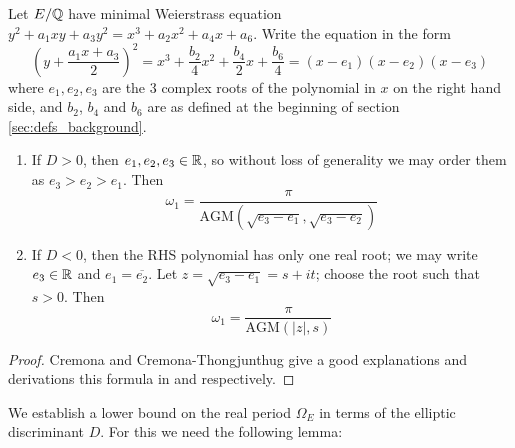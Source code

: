 \documentclass[10pt]{article}
\newcommand{\AGM}{\text{AGM}}
\newcommand{\conj}[1]{\overline{#1}}
\begin{document}
\begin{proposition}
Let $E/\mathbb{Q}$ have minimal Weierstrass equation $y^2 + a_1 xy + a_3 y^2 = x^3 + a_2 x^2 + a_4 x + a_6$. Write the equation in the form
\begin{equation}\label{eqn:weierstrass_with_bn}
\left(y + \frac{a_1x + a_3}{2}\right)^2 = x^3 + \frac{b_2}{4} x^2 + \frac{b_4}{2} x + \frac{b_6}{4} = (x-e_1)(x-e_2)(x-e_3)
\end{equation}
where $e_1,e_2,e_3$ are the 3 complex roots of the polynomial in $x$ on the right hand side, and $b_2$, $b_4$ and $b_6$ are as defined at the beginning of section \ref{sec:defs_background}.
\begin{enumerate}
\item If $D > 0$, then $e_1,e_2,e_3 \in \mathbb{R}$, so without loss of generality we may order them as $e_3 > e_2 > e_1$. Then
\begin{equation}\label{eqn:omega_D_pos}
\omega_1 = \frac{\pi}{\AGM(\sqrt{e_3-e_1},\sqrt{e_3-e_2})}
\end{equation}
\item If $D < 0$, then the RHS polynomial has only one real root; we may write $e_3 \in \mathbb{R}$ and $e_1 = \conj{e_2}$. Let $z = \sqrt{e_3-e_1} = s + it$; choose the root such that $s>0$. Then
\begin{equation}\label{eqn:omega_D_neg}
\omega_1 = \frac{\pi}{\AGM(|z|,s)}
\end{equation}
\end{enumerate}
\end{proposition}
\begin{proof}
Cremona and Cremona-Thongjunthug give a good explanations and derivations this formula in \cite{Cre-1997} and \cite{Cre-2013} respectively.
\end{proof}

We establish a lower bound on the real period $\Omega_E$ in terms of the elliptic discriminant $D$. For this we need the following lemma:
\end{document}

